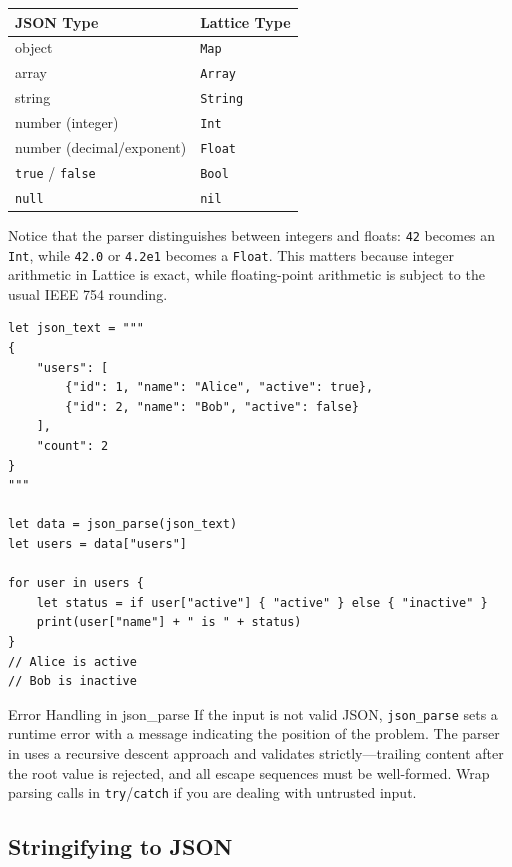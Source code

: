 \begin{center}
\begin{tabular}{ll}
\toprule
\textbf{JSON Type} & \textbf{Lattice Type} \\
\midrule
object & \lstinline|Map| \\
array & \lstinline|Array| \\
string & \lstinline|String| \\
number (integer) & \lstinline|Int| \\
number (decimal/exponent) & \lstinline|Float| \\
\lstinline|true| / \lstinline|false| & \lstinline|Bool| \\
\lstinline|null| & \lstinline|nil| \\
\bottomrule
\end{tabular}
\end{center}

Notice that the parser distinguishes between integers and floats: \texttt{42}
becomes an \lstinline|Int|, while \texttt{42.0} or \texttt{4.2e1} becomes a
\lstinline|Float|. This matters because integer arithmetic in Lattice is
exact, while floating-point arithmetic is subject to the usual IEEE 754
rounding.

\begin{lstlisting}[language=Lattice, caption={Parsing nested JSON structures}]
let json_text = """
{
    "users": [
        {"id": 1, "name": "Alice", "active": true},
        {"id": 2, "name": "Bob", "active": false}
    ],
    "count": 2
}
"""

let data = json_parse(json_text)
let users = data["users"]

for user in users {
    let status = if user["active"] { "active" } else { "inactive" }
    print(user["name"] + " is " + status)
}
// Alice is active
// Bob is inactive
\end{lstlisting}

\begin{warnbox}{Error Handling in json\_parse}
If the input is not valid JSON, \lstinline|json_parse| sets a runtime error
with a message indicating the position of the problem. The parser in
 uses a recursive descent approach and validates
strictly---trailing content after the root value is rejected, and all escape
sequences must be well-formed. Wrap parsing calls in \lstinline|try|/\lstinline|catch|
if you are dealing with untrusted input.
\end{warnbox}

\subsection{Stringifying to JSON}

